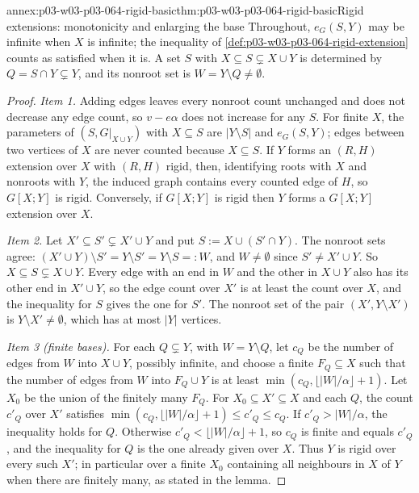 \begin{annexitem}{annex:p03-w03-p03-064-rigid-basic}{thm:p03-w03-p03-064-rigid-basic}{Rigid extensions: monotonicity and enlarging the base}
Throughout, \(e_G(S,Y)\) may be infinite when \(X\) is infinite; the
inequality of \cref{def:p03-w03-p03-064-rigid-extension} counts as satisfied
when it is.  A set \(S\) with \(X\subseteq S\subsetneq X\cup Y\) is determined
by \(Q=S\cap Y\subsetneq Y\), and its nonroot set is \(W=Y\setminus Q\neq
\emptyset\).
\begin{proof}
\emph{Item 1.}  Adding edges leaves every nonroot count unchanged and does
not decrease any edge count, so \(v-e\alpha\) does not increase for any
\(S\).  For finite \(X\), the parameters of \((S,G|_{X\cup Y})\) with
\(X\subseteq S\) are \(|Y\setminus S|\) and \(e_G(S,Y)\); edges between two
vertices of \(X\) are never counted because \(X\subseteq S\).  If \(Y\) forms
an \((R,H)\) extension over \(X\) with \((R,H)\) rigid, then, identifying
roots with \(X\) and nonroots with \(Y\), the induced graph contains every
counted edge of \(H\), so \(G[X;Y]\) is rigid.  Conversely, if \(G[X;Y]\) is
rigid then \(Y\) forms a \(G[X;Y]\) extension over \(X\).

\emph{Item 2.}  Let \(X'\subseteq S'\subsetneq X'\cup Y\) and put
\(S:=X\cup(S'\cap Y)\).  The nonroot sets agree:
\((X'\cup Y)\setminus S'=Y\setminus S'=Y\setminus S=:W\), and \(W\neq\emptyset\)
since \(S'\neq X'\cup Y\).  So \(X\subseteq S\subsetneq X\cup Y\).  Every edge
with an end in \(W\) and the other in \(X\cup Y\) also has its other end in
\(X'\cup Y\), so the edge count over \(X'\) is at least the count over \(X\),
and the inequality for \(S\) gives the one for \(S'\).  The nonroot set of
the pair \((X',Y\setminus X')\) is \(Y\setminus X'\neq\emptyset\), which has at
most \(|Y|\) vertices.

\emph{Item 3 (finite bases).}  For each \(Q\subsetneq Y\), with
\(W=Y\setminus Q\), let \(c_Q\) be the number of edges from \(W\) into
\(X\cup Y\), possibly infinite, and choose a finite \(F_Q\subseteq X\) such
that the number of edges from \(W\) into \(F_Q\cup Y\) is at least
\(\min(c_Q,\lfloor|W|/\alpha\rfloor+1)\).  Let \(X_0\) be the union of the
finitely many \(F_Q\).  For \(X_0\subseteq X'\subseteq X\) and each \(Q\), the
count \(c'_Q\) over \(X'\) satisfies
\(\min(c_Q,\lfloor|W|/\alpha\rfloor+1)\leq c'_Q\leq c_Q\).  If
\(c'_Q>|W|/\alpha\), the inequality holds for \(Q\).  Otherwise
\(c'_Q<\lfloor|W|/\alpha\rfloor+1\), so \(c_Q\) is finite and equals
\(c'_Q\), and the inequality for \(Q\) is the one already given over \(X\).
Thus \(Y\) is rigid over every such \(X'\); in particular over a finite
\(X_0\) containing all neighbours in \(X\) of \(Y\) when there are finitely
many, as stated in the lemma.
\end{proof}
\end{annexitem}

